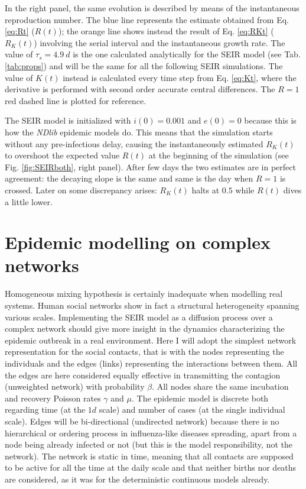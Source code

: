 \documentclass[DIV=12, BCOR=0pt]{scrartcl}  %
\begin{document}
	In the right panel, the same evolution is described by means of the instantaneous reproduction number. The blue line represents the estimate obtained from Eq. \ref{eq:Rt} ($R(t)$); the orange line shows instead the result of Eq. \ref{eq:RKt} ($R_K(t)$) involving the serial interval and the instantaneous growth rate.  The value of $\tau_s = 4.9 \ d$ is the one calculated analytically for the SEIR model (see Tab. \ref{tab:props}) and will be the same for all the following SEIR simulations.
	The value of $K(t)$ instead is calculated every time step from Eq. \ref{eq:Kt}, where the derivative is performed with second order accurate central differences. The $R = 1$ red dashed line is plotted for reference.

	The SEIR model is initialized with $i(0) = 0.001$ and $e(0) = 0$ because this is how the \textit{NDlib} epidemic models do. This means that the simulation starts without any pre-infectious delay, causing the instantaneously estimated $R_K(t)$ to overshoot the expected value $R(t)$ at the beginning of the simulation (see Fig. \ref{fig:SEIRboth}, right panel). After few days the two estimates are in perfect agreement: the decaying slope is the same and same is the day when $R = 1$ is crossed. Later on some discrepancy arises: $R_K(t)$ halts at $0.5$ while $R(t)$ dives a little lower.
 
  

  
  \section{Epidemic modelling on complex networks}
  \label{sec:network}
  Homogeneous mixing hypothesis is certainly inadequate when modelling real systems. Human social networks show in fact a structural heterogeneity spanning various scales. Implementing the SEIR model as a diffusion process over a complex network should give more insight in the dynamics characterizing the epidemic outbreak in a real environment. Here I will adopt the simplest network representation for the social contacts, that is with the nodes representing the individuals and the edges (links) representing the interactions between them. All the edges are here considered equally effective in transmitting the contagion (unweighted network) with probability $\beta$. All nodes share the same incubation and recovery Poisson rates $\gamma$ and $\mu$. 
  The epidemic model is discrete both regarding time (at the $1 d$ scale) and number of cases (at the single individual scale). Edges will be bi-directional (undirected network) because there is no hierarchical or ordering process in influenza-like diseases spreading, apart from a node being already infected or not (but this is the model responsibility, not the network). The network is static in time, meaning that all contacts are supposed to be active for all the time at the daily scale and that neither births nor deaths are considered, as it was for the deterministic continuous models already. 
  
\end{document}
